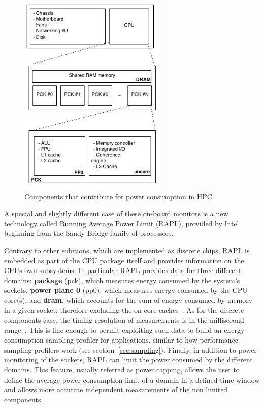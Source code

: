 \documentclass[a4paper]{jpconf}
\begin{document}
\begin{figure}[tbp]
\centering
\includegraphics[width=70mm]{img/energy_model.png}
\caption{Components that contribute for power consumption in HPC}
\label{fig:power-consumption-model}
\end{figure}

A special and slightly different case of these on-board monitors
is a new technology called Running Average Power Limit (RAPL),
provided by Intel beginning from the Sandy Bridge family of processors.

Contrary to other solutions, which are implemented as discrete
chips, RAPL is embedded as part of the CPU package itself and
provides information on the CPUs own subsystems. In particular RAPL
provides data for three different domains: \textbf{package} (pck),
which measures energy consumed by the system's sockets, \textbf{power
plane 0} (pp0), which measures energy consumed by the CPU core(s),
and \textbf{dram}, which accounts for the sum of energy consumed
by memory in a given socket, therefore excluding the on-core
caches~\cite{INTELMAN}. As for the discrete components case, the
timing resolution of measurements is in the millisecond range~\cite{RAPL1}.
This is fine enough to permit exploiting such data to build an energy
consumption sampling profiler for applications, similar to how performance
sampling profilers work (see section~\ref{sec:sampling}).
Finally, in addition to power
monitoring of the sockets, RAPL can limit the power consumed by the
different domains. This feature, usually referred as power capping,
allows the user to define the average power consumption limit of a
domain in a defined time window and allows more accurate independent
measurements of the non limited components.
\end{document}
